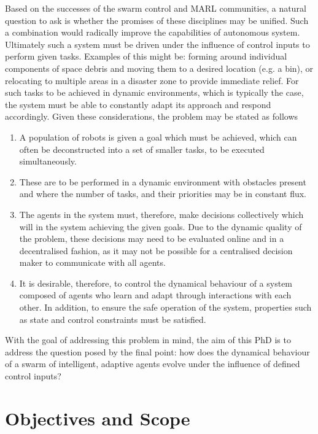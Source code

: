 \documentclass[.../main.tex]{subfiles}
\begin{document}
    Based on the successes of the swarm control and MARL communities, a natural question to ask is
    whether the promises of these disciplines may be unified. Such a combination would radically
    improve the capabilities of autonomous system. Ultimately such a system must be driven under the
    influence of control inputs to perform given tasks. Examples of this might be: forming around
    individual components of space debris and moving them to a desired location (e.g. a bin), or
    relocating to multiple areas in a disaster zone to provide immediate relief. For such tasks to
    be achieved in dynamic environments, which is typically the case, the system must be able to
    constantly adapt its approach and respond accordingly. Given these considerations, the problem
    may be stated as follows

    \begin{enumerate}
    	\item A population of robots is given a goal which must be achieved, which can often be
    	deconstructed into a set of smaller tasks, to be executed simultaneously. 
    	\item These are to be performed in a dynamic environment with obstacles present and where
    	the number of tasks, and their priorities may be in constant flux.
    	\item The agents in the system must, therefore, make decisions collectively which will in
    	the system achieving the given goals. Due to the dynamic quality of the problem, these
    	decisions may need to be evaluated online and in a decentralised fashion, as it may not be
    	possible for a centralised decision maker to communicate with all agents.
    	\item It is desirable, therefore, to control the dynamical behaviour of
    	a system composed of agents who learn and adapt through interactions with each other. In
    	addition, to ensure the safe operation of the system, properties such as state and control
    	constraints must be satisfied.
    \end{enumerate}


    With the goal of addressing this problem in mind, the aim of this PhD is to address the question
    posed by the final point: how does the dynamical behaviour of a swarm of intelligent, adaptive
    agents evolve under the influence of defined control inputs?

    \section{Objectives and Scope} \label{sec::Objectives_and_Scope}
\end{document}
